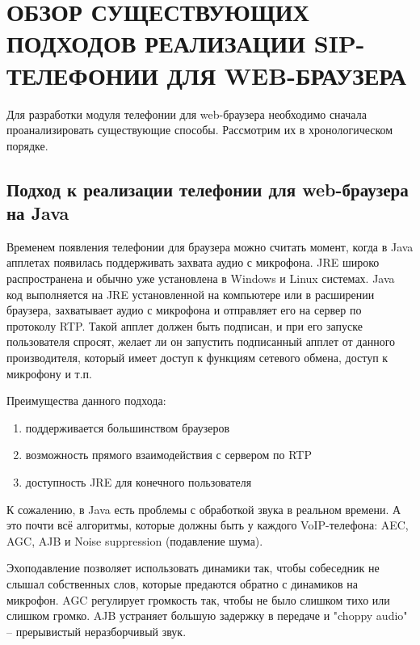 \chapter{ОБЗОР СУЩЕСТВУЮЩИХ ПОДХОДОВ РЕАЛИЗАЦИИ SIP-ТЕЛЕФОНИИ ДЛЯ WEB-БРАУЗЕРА}
\label{chapter:analysis}

Для разработки модуля телефонии для web-браузера необходимо сначала проанализировать существующие способы. Рассмотрим их в хронологическом порядке.

\section{Подход к реализации телефонии для web-браузера на Java}

Временем появления телефонии для браузера можно считать момент, когда в Java апплетах появилась поддерживать захвата аудио с микрофона. JRE широко распространена и обычно уже установлена в Windows и Linux системах.\cite{webrtc_flash_java} Java код выполняется на JRE установленной на компьютере или в расширении браузера, захватывает аудио с микрофона и отправляет его на сервер по протоколу RTP. Такой апплет должен быть подписан, и при его запуске пользователя спросят, желает ли он запустить подписанный апплет от данного производителя, который имеет доступ к функциям сетевого обмена, доступ к микрофону и т.п.

Преимущества данного подхода:
\begin{enumerate}
\item поддерживается большинством браузеров
\item возможность прямого взаимодействия с сервером по RTP
\item доступность JRE для конечного пользователя
\end{enumerate}

К сожалению, в Java есть проблемы с обработкой звука в реальном времени. А это почти всё алгоритмы, которые должны быть у каждого VoIP-телефона: AEC, AGC, AJB и Noise suppression (подавление шума).

Эхоподавление позволяет использовать динамики так, чтобы собеседник не слышал собственных слов, которые предаются обратно с динамиков на микрофон. AGC регулирует громкость так, чтобы не было слишком тихо или слишком громко. AJB устраняет большую задержку в передаче и "choppy audio" – прерывистый неразборчивый звук.

